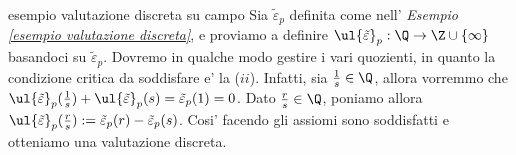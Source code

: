 \begin{example}{esempio valutazione discreta su campo}
  Sia $\tilde{\varepsilon}_p$ definita come nell' \emph{Esempio \ref{esempio valutazione discreta}}, e proviamo a definire
  $\ul{\tilde{\varepsilon}}_p : \Q \rightarrow \Z \cup \{ \infty \}$ basandoci su $\tilde{\varepsilon}_p$. Dovremo in qualche modo gestire i vari quozienti, 
  in quanto la condizione critica da soddisfare e' la ($ii$). Infatti, sia $\frac{1}{s} \in \Q$, allora vorremmo che 
  $\ul{\tilde{\varepsilon}}_p(\frac{1}{s}) + \ul{\tilde{\varepsilon}}_p(s) = \tilde{\varepsilon}_p(1) = 0$. Dato $\frac{r}{s} \in \Q$, poniamo allora
  \mbox{$\ul{\tilde{\varepsilon}}_p(\frac{r}{s}) := \tilde{\varepsilon}_p(r) - \tilde{\varepsilon}_p(s)$}. Cosi' facendo gli assiomi sono 
  soddisfatti e otteniamo una valutazione discreta.
\end{example}

\clearpage